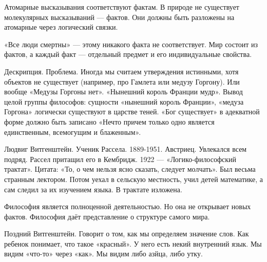 Атомарные высказывания соответствуют фактам.
В природе не существует молекулярных высказываний --- фактов. Они должны быть разложены на атомарные через логический связки.                                         

«Все люди смертны» --- этому никакого факта не соответствует. Мир состоит из фактов, а каждый факт --- отдельный предмет и его индивидуальные свойства.

Дескрипция.
Проблема. Иногда мы считаем утверждения истинными, хотя объектов не существует (например, про Гамлета или медузу Горгону). Или вообще «Медузы Горгоны нет».
«Нынешний король Франции мудр». Вывод целой группы философов: сущности «нынешний король Франции», «медуза Горгона» логически существуют в царстве теней.
«Бог существует» в адекватной форме должно быть записано «Нечто причем только одно является единственным, всемогущим и блаженным».

Людвиг Витгенштейн. Ученик Рассела. 1889-1951. Австриец. Увлекался всем подряд. Рассел притащил его в Кембридж. 1922 --- «Логико-философский трактат». 
Цитата: «То, о чем нельзя ясно сказать, следует молчать». Был весьма странным лектором. Потом уехал в сельскую местность, учил детей математике, а сам следил за их изучением языка.
В трактате изложена.

Философия является полноценной деятельностью. Но она не открывает новых фактов. Философия даёт представление о структуре самого мира.

Поздний Витгенштейн. Говорит о том, как мы определяем значение слов. 
Как ребенок понимает, что такое «красный». У него есть некий внутренний язык. 
Мы видим «что-то» через «как». Мы видим либо азйца, либо утку.
